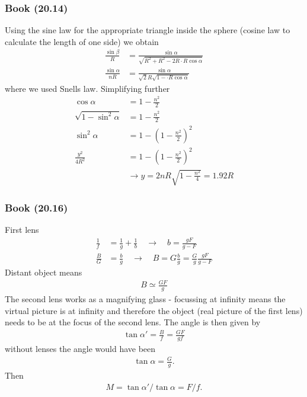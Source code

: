 \documentclass[10pt,a4paper]{book}
\theoremstyle{definition}
\begin{document}
\subsubsection{Book (20.14)}
Using the sine law for the appropriate triangle inside the sphere (cosine law to calculate the length of one side) we obtain
\begin{align}
\frac{\sin\beta}{R}&=\frac{\sin\alpha}{\sqrt{R^2+R^2-2R\cdot R\cos\alpha}}\\
\frac{\sin\alpha}{nR}&=\frac{\sin\alpha}{\sqrt{2}R\sqrt{1-\cdot R\cos\alpha}}
\end{align}
where we used Snells law. Simplifying further
\begin{align}
\cos\alpha&=1-\frac{n^2}{2}\\
\sqrt{1-\sin^2\alpha}&=1-\frac{n^2}{2}\\
\sin^2\alpha&=1-\left(1-\frac{n^2}{2}\right)^2\\
\frac{y^2}{4R^2}&=1-\left(1-\frac{n^2}{2}\right)^2\\
&\rightarrow y=2nR\sqrt{1-\frac{n^2}{4}}=1.92R
\end{align}

\subsubsection{Book (20.16)}
First lens
\begin{align}
\frac{1}{f}&=\frac{1}{g}+\frac{1}{b}\quad\rightarrow\quad b=\frac{gF}{g-F}\\
\frac{B}{G}&=\frac{b}{g}\quad\rightarrow\quad B=G\frac{b}{g}=\frac{G}{g}\frac{gF}{g-F}
\end{align}
Distant object means
\begin{align}
B\simeq\frac{GF}{g}
\end{align}
The second lens works as a magnifying glass - focussing at infinity means the virtual picture is at infinity and therefore the object (real picture of the first lens) needs to be at the focus of the second lens.
The angle is then given by
\begin{align}
\tan\alpha'=\frac{B}{f}=\frac{GF}{gf}
\end{align}
without lenses the angle would have been
\begin{align}
\tan\alpha=\frac{G}{g}.
\end{align}
Then
\begin{align}
M=\tan\alpha'/\tan\alpha=F/f.
\end{align}
\end{document}
